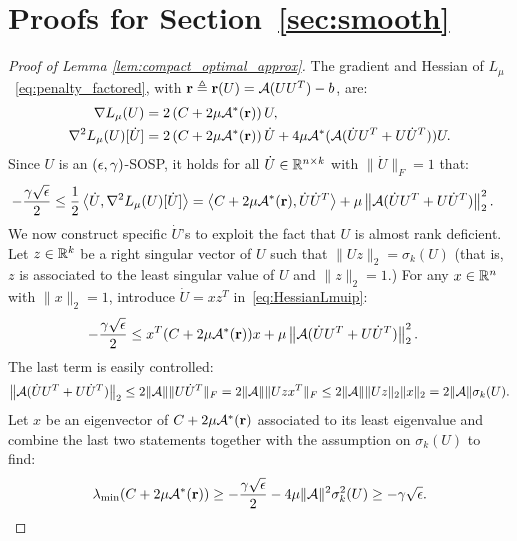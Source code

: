 \section{Proofs for Section~\ref{sec:smooth}}\label{app:smooth}

\begin{proof}[Proof of Lemma \ref{lem:compact_optimal_approx}]
	The gradient and Hessian of $L_\mu$~\eqref{eq:penalty_factored}, with $\mathbf{r} \triangleq \mathbf{r}(U) = \mathcal{A}(UU^T)-b$, are:
	\begin{align}
		\nabla L_\mu(U) & = 2\left( C + 2\mu\mathcal{A}^*(\mathbf{r}) \right)U,\label{eq:gradLmu}\\
		\nabla^2 L_\mu(U)[\dot U] & = 2\left( C + 2\mu\mathcal{A}^*(\mathbf{r}) \right)\dot U + 4\mu\mathcal{A}^*(\mathcal{A}(\dot U U^T + U\dot U^T))U. \label{eq:HessianLmu}
	\end{align}
	Since $U$ is an $(\epsilon, \gamma)$-SOSP, it holds for all $\dot U \in \mathbb{R}^{n\times k}$ with $\|\dot U\|_F = 1$ that:
	\begin{align}
		-\frac{\gamma\sqrt{\epsilon}}{2} & \leq \frac{1}{2} \left\langle \dot U, \nabla^2 L_\mu(U)[\dot U] \right\rangle = \left\langle C + 2\mu\mathcal{A}^*(\mathbf{r}), \dot U \dot U^T \right\rangle + \mu \left\|\mathcal{A}(\dot U U^T + U \dot U^T)\right\|_2^2.
		 \label{eq:HessianLmuip}
	\end{align}
	We now construct specific $\dot U$'s to exploit the fact that $U$ is almost rank deficient. Let $z \in \mathbb{R}^k$ be a right singular vector of $U$ such that $\|Uz\|_2 =\sigma_k(U)$ (that is, $z$ is associated to the least singular value of $U$ and $\|z\|_2 = 1$.) For any $x \in \mathbb{R}^{n}$ with $\|x\|_2 = 1$, introduce $\dot U = xz^T$ in~\eqref{eq:HessianLmuip}:
	\begin{align*}
	 	-\frac{\gamma\sqrt{\epsilon}}{2} & \leq x^T(C + 2\mu\mathcal{A}^*(\mathbf{r}))x + \mu \left\|\mathcal{A}(\dot U U^T + U \dot U^T)\right\|_2^2.
	\end{align*}
	The last term is easily controlled:
	\begin{align*}
		\left\|\mathcal{A}(\dot U U^T + U \dot U^T)\right\|_2 \leq 2 \|\mathcal{A}\| \|U\dot U^T\|_F = 2 \|\mathcal{A}\| \|Uzx^T\|_F \leq 2 \|\mathcal{A}\|\|Uz\|_2 \|x\|_2 = 2 \|\mathcal{A}\|\sigma_k(U).
	\end{align*}
	Let $x$ be an eigenvector of $C + 2\mu\mathcal{A}^*(\mathbf{r})$ associated to its least eigenvalue and combine the last two statements together with the assumption on $\sigma_k(U)$ to find:
	\begin{align}
		\lambda_{\min}(C + 2\mu\mathcal{A}^*(\mathbf{r})) \geq -\frac{\gamma\sqrt{\epsilon}}{2} - 4\mu\|\mathcal{A}\|^2\sigma_k^2(U) \geq -\gamma\sqrt{\epsilon}.
		\label{eq:lambdaminC2mu}
	\end{align}

\end{proof}
